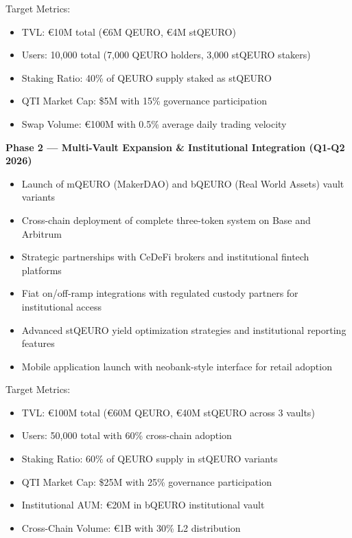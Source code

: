 Target Metrics:

\begin{itemize}
\item
  TVL: €10M total (€6M QEURO, €4M stQEURO)
\item
  Users: 10,000 total (7,000 QEURO holders, 3,000 stQEURO stakers)
\item
  Staking Ratio: 40\% of QEURO supply staked as stQEURO
\item
  QTI Market Cap: \$5M with 15\% governance participation
\item
  Swap Volume: €100M with 0.5\% average daily trading velocity
\end{itemize}

\textbf{Phase 2 --- Multi-Vault Expansion \& Institutional Integration
(Q1-Q2 2026)}

\begin{itemize}
\item
  Launch of mQEURO (MakerDAO) and bQEURO (Real World Assets) vault
  variants
\item
  Cross-chain deployment of complete three-token system on Base and
  Arbitrum
\item
  Strategic partnerships with CeDeFi brokers and institutional fintech
  platforms
\item
  Fiat on/off-ramp integrations with regulated custody partners for
  institutional access
\item
  Advanced stQEURO yield optimization strategies and institutional
  reporting features
\item
  Mobile application launch with neobank-style interface for retail
  adoption
\end{itemize}

Target Metrics:

\begin{itemize}
\item
  TVL: €100M total (€60M QEURO, €40M stQEURO across 3 vaults)
\item
  Users: 50,000 total with 60\% cross-chain adoption
\item
  Staking Ratio: 60\% of QEURO supply in stQEURO variants
\item
  QTI Market Cap: \$25M with 25\% governance participation
\item
  Institutional AUM: €20M in bQEURO institutional vault
\item
  Cross-Chain Volume: €1B with 30\% L2 distribution
\end{itemize}

